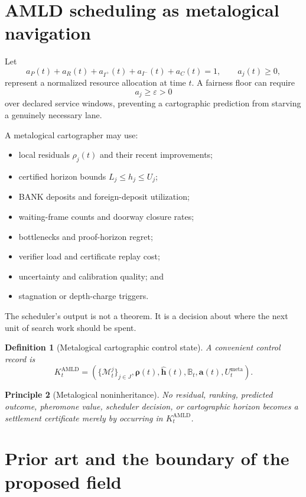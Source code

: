 \documentclass[11pt]{article}
\newtheorem{definition}{Definition}[section]
\newtheorem{principle}[definition]{Principle}
\newcommand{\BANK}{\mathbb{B}}
\begin{document}
\section{AMLD scheduling as metalogical navigation}

Let
\[
a_P(t)+a_R(t)+a_{I^+}(t)+a_{I^-}(t)+a_C(t)=1,
\qquad a_j(t)\ge0,
\]
represent a normalized resource allocation at time $t$. A fairness floor can require
\[
a_j\ge\varepsilon>0
\]
over declared service windows, preventing a cartographic prediction from starving a genuinely necessary lane.

A metalogical cartographer may use:
\begin{itemize}
\item local residuals $\rho_j(t)$ and their recent improvements;
\item certified horizon bounds $L_j\le h_j\le U_j$;
\item BANK deposits and foreign-deposit utilization;
\item waiting-frame counts and doorway closure rates;
\item bottlenecks and proof-horizon regret;
\item verifier load and certificate replay cost;
\item uncertainty and calibration quality; and
\item stagnation or depth-charge triggers.
\end{itemize}

The scheduler's output is not a theorem. It is a decision about where the next unit of search work should be spent.

\begin{definition}[Metalogical cartographic control state]
A convenient control record is
\[
K_t^{\mathrm{AMLD}}
=
\left(
\{\mathcal M_t^j\}_{j\in J},
\boldsymbol\rho(t),
\widehat{\mathbf h}(t),
\BANK_t,
\mathbf a(t),
U_t^{\mathrm{meta}}
\right).
\]
\end{definition}

\begin{principle}[Metalogical noninheritance]
No residual, ranking, predicted outcome, pheromone value, scheduler decision, or cartographic horizon becomes a settlement certificate merely by occurring in $K_t^{\mathrm{AMLD}}$.
\end{principle}

\section{Prior art and the boundary of the proposed field}
\end{document}

